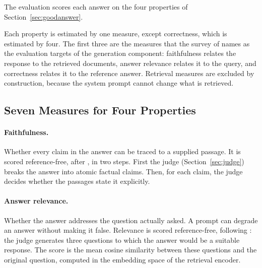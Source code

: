 \documentclass[12pt,a4paper,oneside]{scrreprt}
\begin{document}
The evaluation scores each answer on the four properties of Section~\ref{sec:goodanswer}.

Each property is estimated by one measure, except correctness, which is estimated by four. The first three are the measures that the survey of \citet{yu2024ragevalsurvey} names as the evaluation targets of the generation component: faithfulness relates the response to the retrieved documents, answer relevance relates it to the query, and correctness relates it to the reference answer. Retrieval measures are excluded by construction, because the system prompt cannot change what is retrieved.

\subsection{Seven Measures for Four Properties}

\paragraph{Faithfulness.} Whether every claim in the answer can be traced to a supplied passage. It is scored reference-free, after \citet{es2023ragas}, in two steps. First the judge (Section~\ref{sec:judge}) breaks the answer into atomic factual claims. Then, for each claim, the judge decides whether the passages state it explicitly.  

\paragraph{Answer relevance.} Whether the answer addresses the question actually asked. A prompt can degrade an answer without making it false. Relevance is scored reference-free, following \citet{es2023ragas}: the judge generates three questions to which the answer would be a suitable response. The score is the mean cosine similarity between these questions and the original question, computed in the embedding space of the retrieval encoder. 
\end{document}

